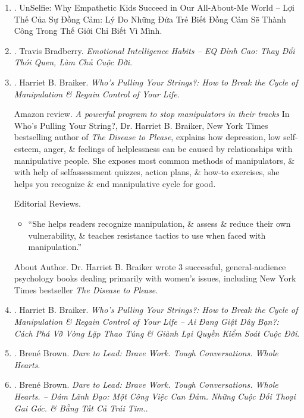 \documentclass{article}
\begin{document}
\begin{enumerate}
	\item \cite{Borba_sympathy_VN}. {\sc UnSelfie: Why Empathetic Kids Succeed in Our All-About-Me World -- Lợi Thế Của Sự Đồng Cảm: Lý Do Những Đứa Trẻ Biết Đồng Cảm Sẽ Thành Công Trong Thế Giới Chỉ Biết Vì Mình}.\hfill{\sf[done]}
	
	\item \cite{Bradberry_EQ_VN}. {\sc Travis Bradberry}. {\it Emotional Intelligence Habits -- EQ Đỉnh Cao: Thay Đổi Thói Quen, Làm Chủ Cuộc Đời}.\hfill{\sf[done]}

	\item \cite{Braiker_string}. {\sc Harriet B. Braiker}. {\it Who's Pulling Your Strings?: How to Break the Cycle of Manipulation \& Regain Control of Your Life}. {}

	{\sf Amazon review.} {\it A powerful program to stop manipulators in their tracks} In Who's Pulling Your String?, Dr. {\sc Harriet B. Braiker}, New York Times bestselling author of {\it The Disease to Please}, explains how depression, low self-esteem, anger, \& feelings of helplessness can be caused by relationships with manipulative people. She exposes most common methods of manipulators, \& with help of selfassessment quizzes, action plans, \& how-to exercises, she helps you recognize \& end manipulative cycle for good.

	{\sf Editorial Reviews.}
	\begin{itemize}
		\item ``She helps readers recognize manipulation, \& assess \& reduce their own vulnerability, \& teaches resistance tactics to use when faced with manipulation.''
	\end{itemize}
	{\sf About Author.} Dr. {\sc Harriet B. Braiker} wrote 3 successful, general-audience psychology books dealing primarily with women's issues, including New York Times bestseller {\it The Disease to Please}.

	\item \cite{Braiker_string_VN}. {\sc Harriet B. Braiker}. {\it Who's Pulling Your Strings?: How to Break the Cycle of Manipulation \& Regain Control of Your Life -- Ai Đang Giật Dây Bạn?: Cách Phá Vỡ Vòng Lặp Thao Túng \& Giành Lại Quyền Kiểm Soát Cuộc Đời}.

	\item \cite{Brown_dare_lead}. {\sc Bren\'e Brown}. {\it Dare to Lead: Brave Work. Tough Conversations. Whole Hearts}.

	\item \cite{Brown_dare_lead_VN}. {\sc Bren\'e Brown}. {\it Dare to Lead: Brave Work. Tough Conversations. Whole Hearts.  -- Dám Lãnh Đạo: Một Công Việc Can Đảm. Những Cuộc Đối Thoại Gai Góc. \& Bằng Tất Cả Trái Tim.}.\hfill{\sf[done]}


\end{enumerate}
\end{document}
